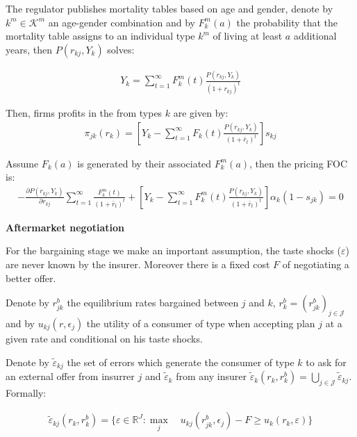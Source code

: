 \documentclass[12pt]{article}
\theoremstyle{plain}
\theoremstyle{plain}
\begin{document}
The regulator publishes mortality tables based on age and gender, denote by $k^m \in \mathcal{K}^m$ an age-gender combination and by $F_k^m(a)$ the probability that the mortality table assigns to an individual type $k^m$ of living at least $a$ additional years, then $P(r_{kj},Y_k)$ solves:

\begin{align}
    Y_k = \sum_{t=1}^{\infty} F_k^m(t) \frac{P(r_{kj},Y_k)}{(1+r_{kj})^t} 
\end{align}


Then, firms profits in the from types $k$ are given by: 
\begin{align}
    \pi_{jk}( r_k) = \left[Y_k -   \sum_{t=1}^{\infty} F_k(t) \frac{P(r_{kj},Y_k)}{(1+\bar{r}_t)^t} \right] s_{kj}
\end{align}

Assume $F_k(a)$ is generated by their associated $F_k^m(a)$, then the pricing FOC is: 
\begin{align}\label{eq:FOC_simplified}
    - \frac{\partial P(r_{kj},Y_k)}{\partial r_{kj}}  \sum_{t=1}^{\infty}  \frac{F_k^m(t)}{(1+\bar{r}_t)^t}  
    + \left[Y_k -   \sum_{t=1}^{\infty} F_k^m(t) \frac{P(r_{kj},Y_k)}{(1+\bar{r}_t)^t} \right] 
    \alpha_{k}(1-s_{jk}) =0
\end{align}


\textbf{Aftermarket negotiation}

For the bargaining stage we make an important assumption, the taste shocks ($\varepsilon$) are never known by the insurer. Moreover there is a fixed cost $F$ of negotiating a better offer. 

Denote by $r_{jk}^b$ the equilibrium rates bargained between $j$ and $k$, $r_{k}^b= (r_{jk}^b)_{j\in \mathcal{J}}$ and by $u_{kj}(r,\epsilon_j)$ the utility of a consumer of type when accepting plan $j$ at a given rate and conditional on his taste shocks. 


Denote by $\tilde{\varepsilon}_{kj}$ the set of errors which generate the consumer of type $k$ to ask for an external offer from insurrer $j$ and $\tilde{\varepsilon}_{k}$ from any insurer $\tilde{\varepsilon}_{k}(r_k, r_{k}^b) = \bigcup_{j\in \mathcal{J}} \tilde{\varepsilon}_{kj}$. Formally: 

\begin{align}
    \tilde{\varepsilon}_{kj}(r_k, r_{k}^b) = \{ \varepsilon \in \mathbb{R}^J: \underset{j}{\max} \quad u_{kj}(r_{jk}^b, \epsilon_j) - F \geq u_{k}(r_k, \varepsilon) \}
\end{align}
\end{document}
